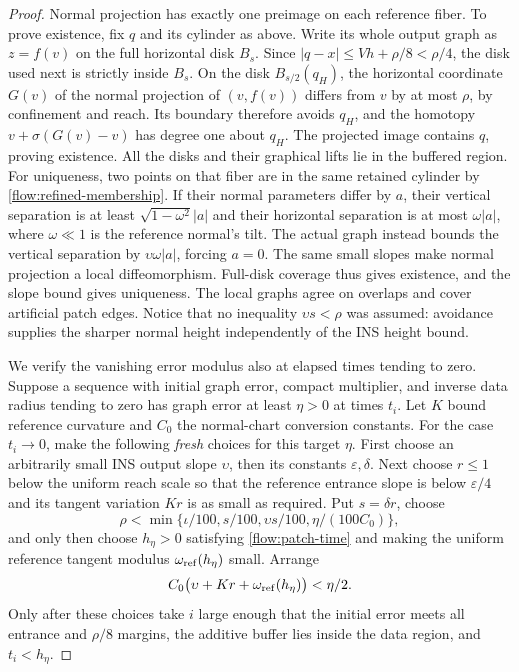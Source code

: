 \begin{proof}
Normal projection has exactly one preimage on each reference fiber.
To prove existence, fix $q$ and its cylinder as above.  Write its
whole output graph as $z=f(v)$ on the full horizontal disk $B_s$.
Since $|q-x|\le Vh+\rho/8<\rho/4$, the disk used next is
strictly inside $B_s$.
On the disk $B_{s/2}(q_H)$, the horizontal coordinate $G(v)$ of the
normal projection of $(v,f(v))$ differs from $v$ by at most $\rho$,
by confinement and reach.  Its boundary therefore avoids $q_H$,
and the homotopy $v+\sigma(G(v)-v)$ has degree one about $q_H$.
The projected image contains $q$, proving existence.  All the disks
and their graphical lifts lie in the buffered region.  For uniqueness,
two points on that fiber are in the same retained cylinder by
\eqref{flow:refined-membership}.  If their normal parameters differ
by $a$, their vertical separation is at least
$\sqrt{1-\omega^2}|a|$ and their horizontal separation is at most
$\omega|a|$, where $\omega\ll1$ is the reference normal's tilt.
The actual graph instead bounds the vertical separation by
$\upsilon\omega|a|$, forcing $a=0$.  The same small slopes make
normal projection a local diffeomorphism.  Full-disk coverage thus
gives existence, and the slope bound gives uniqueness.  The local
graphs agree on overlaps and cover artificial patch edges.  Notice
that no inequality $\upsilon s<\rho$ was assumed: avoidance
supplies the sharper normal height independently of the INS height
bound.

We verify the vanishing error modulus also at elapsed times tending
to zero.  Suppose a sequence with initial graph error, compact
multiplier, and inverse data radius tending to zero has graph error
at least $\eta>0$ at times $t_i$.  Let $K$ bound reference curvature
and $C_0$ the normal-chart conversion constants.  For the case $t_i\to0$, make
the following \emph{fresh} choices for this target $\eta$.  First
choose an arbitrarily small INS output slope $\upsilon$, then its
constants $\varepsilon,\delta$.  Next choose $r\le1$ below the
uniform reach scale so that the reference entrance slope is below
$\varepsilon/4$ and its tangent variation $Kr$ is as small as
required.  Put $s=\delta r$, choose
\[
 \rho<\min\{\iota/100,s/100,\upsilon s/100,\eta/(100C_0)\},
\]
and only then choose $h_\eta>0$ satisfying
\eqref{flow:patch-time} and making the uniform reference tangent
modulus $\omega_{\rm ref}(h_\eta)$ small.  Arrange
\[
 C_0\bigl(\upsilon+Kr+\omega_{\rm ref}(h_\eta)\bigr)<\eta/2.
\]
Only after these choices take $i$ large enough that the initial
error meets all entrance and $\rho/8$ margins, the additive buffer
lies inside the data region, and $t_i<h_\eta$.


\end{proof}
